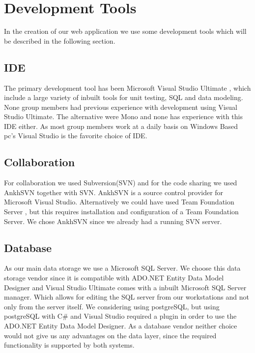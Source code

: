 \section{Development Tools}
In the creation of our web application we use some development tools which will be described in the following section. 

\subsection{IDE}
\label{sub:ide}
The primary development tool has been Microsoft Visual Studio Ultimate \cite{visualStudio}, which include a large variety of inbuilt tools for unit testing, SQL and data modeling. 
None group members had previous experience with development using Visual Studio Ultimate. The alternative were Mono and none has experience with this IDE either. 
As most group members work at a daily basis on Windows Based pc's Visual Studio is the favorite choice of IDE. 



\subsection{Collaboration}
\label{sub:collaboration}
For collaboration we used Subversion(SVN) and for the code sharing we used AnkhSVN \cite{ankhsvn} together with SVN. 
AnkhSVN is a source control provider for Microsoft Visual Studio. 
Alternatively we could have used Team Foundation Server \cite{teamfoundation}, but this requires installation and configuration of a Team Foundation Server. 
We chose AnkhSVN since we already had a running SVN server. 

\subsection{Database}
\label{sub:database}
As our main data storage we use a Microsoft SQL Server. 
We choose this data storage vendor since it is compatible with ADO.NET Entity Data Model Designer and Visual Studio Ultimate comes with a inbuilt Microsoft SQL Server manager. 
Which allows for editing the SQL server from our workstations and not only from the server itself. 
We considering using postgreSQL, but using postgreSQL with C\# and Visual Studio required a plugin in order to use the ADO.NET Entity Data Model Designer. 
As a database vendor neither choice would not give us any advantages on the data layer, since the required functionality is supported by both systems. 